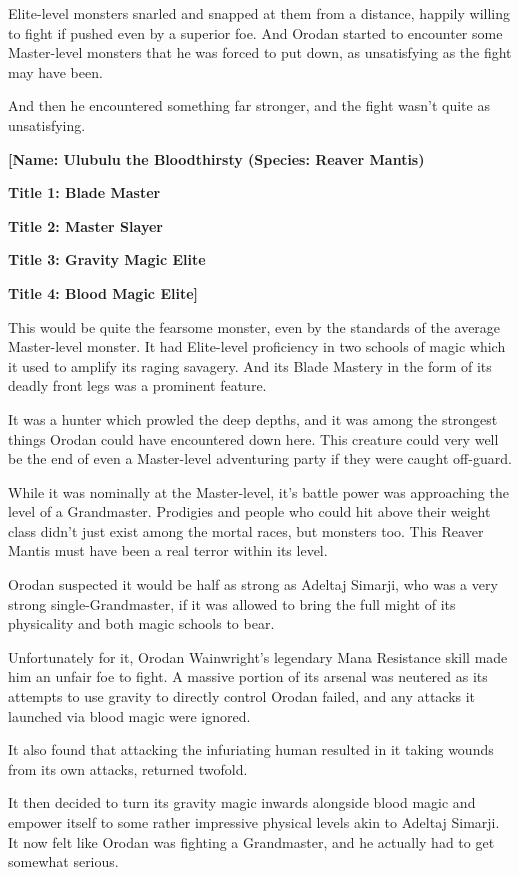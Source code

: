 \documentclass[a4paper,10pt]{book}
\begin{document}
Elite-level monsters snarled and snapped at them from a distance, happily willing to fight if pushed even by a superior foe. And Orodan started to encounter some Master-level monsters that he was forced to put down, as unsatisfying as the fight may have been.\par
And then he encountered something far stronger, and the fight wasn’t quite as unsatisfying.\par
\textbf{[Name: Ulubulu the Bloodthirsty (Species: Reaver Mantis)}\par
\textbf{Title 1: Blade Master}\par
\textbf{Title 2: Master Slayer}\par
\textbf{Title 3: Gravity Magic Elite}\par
\textbf{Title 4: Blood Magic Elite]}\par
This would be quite the fearsome monster, even by the standards of the average Master-level monster. It had Elite-level proficiency in two schools of magic which it used to amplify its raging savagery. And its Blade Mastery in the form of its deadly front legs was a prominent feature.\par
It was a hunter which prowled the deep depths, and it was among the strongest things Orodan could have encountered down here. This creature could very well be the end of even a Master-level adventuring party if they were caught off-guard.\par
While it was nominally at the Master-level, it’s battle power was approaching the level of a Grandmaster. Prodigies and people who could hit above their weight class didn’t just exist among the mortal races, but monsters too. This Reaver Mantis must have been a real terror within its level.\par
Orodan suspected it would be half as strong as Adeltaj Simarji, who was a very strong single-Grandmaster, if it was allowed to bring the full might of its physicality and both magic schools to bear.\par
Unfortunately for it, Orodan Wainwright’s legendary Mana Resistance skill made him an unfair foe to fight. A massive portion of its arsenal was neutered as its attempts to use gravity to directly control Orodan failed, and any attacks it launched via blood magic were ignored.\par
It also found that attacking the infuriating human resulted in it taking wounds from its own attacks, returned twofold.\par
It then decided to turn its gravity magic inwards alongside blood magic and empower itself to some rather impressive physical levels akin to Adeltaj Simarji. It now felt like Orodan was fighting a Grandmaster, and he actually had to get somewhat serious.\par
\end{document}
